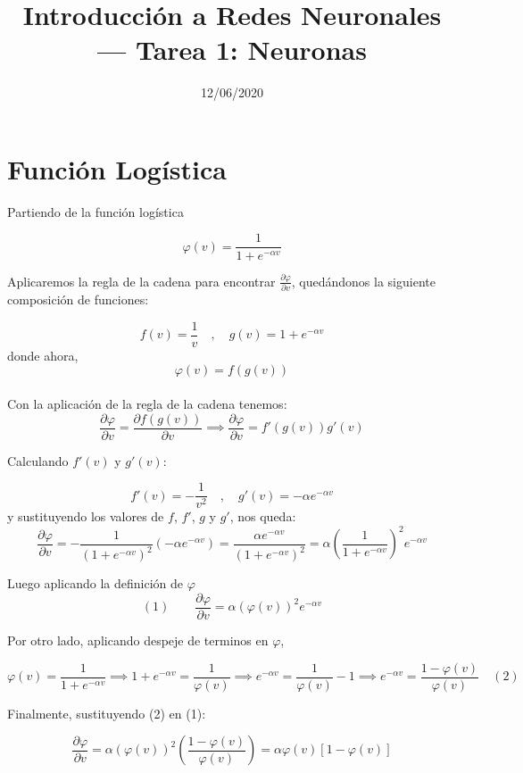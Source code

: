 \documentclass[a4paper]{article}
\title{Introducción a Redes Neuronales --- Tarea 1: Neuronas}
\author{David Segura, Carnet #13-11341
}
\date{12/06/2020}
\theoremstyle{definition}
\theoremstyle{plain}
\begin{document}
\maketitle


\section{Función Logística}

Partiendo de la función logística

$$ \varphi (v) = \frac{1}{1 + e^{-\alpha v}} $$

Aplicaremos la regla de la cadena para encontrar $ \frac{\partial \varphi}{\partial v} $, quedándonos la siguiente composición de funciones:

$$ f(v) = \frac{1}{v} \quad,\quad g(v) = 1 + e^{-\alpha v} $$
donde ahora,
$$ \varphi (v) = f(g(v)) $$\\

Con la aplicación de la regla de la cadena tenemos:
$$ \frac{\partial \varphi}{\partial v} =\frac{\partial f(g(v))}{\partial v} \implies \frac{\partial \varphi}{\partial v} = f'(g(v)) g'(v)$$

Calculando $f'(v) $ y $ g'(v)$: 

$$ f'(v) = - \frac{1}{v^2} \quad,\quad g'(v) = -\alpha e^{-\alpha v} $$
y sustituyendo los valores de $f$, $f'$, $g$ y $g'$, nos queda:
$$ \frac{\partial \varphi}{\partial v} = -\frac{1}{(1 + e^{-\alpha v})^2} (-\alpha e^{-\alpha v}) = \frac{\alpha e^{-\alpha v}}{(1 + e^{-\alpha v})^2} = \alpha \left(\frac{1}{1 + e^{-\alpha v}} \right)^2 e^{-\alpha v} $$ 

Luego aplicando la definición de $ \varphi $
$$ (1) \qquad \frac{\partial \varphi}{\partial v} = \alpha (\varphi (v))^2 e^{-\alpha v} $$

Por otro lado, aplicando despeje de terminos en $ \varphi $,

$$ \varphi (v) = \frac{1}{1 + e^{-\alpha v}} \implies 
1 + e^{-\alpha v} = \frac{1}{\varphi (v)} \implies
e^{-\alpha v} = \frac{1}{\varphi (v)} - 1 \implies
e^{-\alpha v} = \frac{1-\varphi (v)}{\varphi (v)} \quad (2)$$

Finalmente, sustituyendo (2) en (1):

$$ \frac{\partial \varphi}{\partial v} = \alpha (\varphi (v))^2 \left ( \frac{1-\varphi (v)}{\varphi (v)} \right) = \alpha \varphi (v) [1-\varphi (v)] $$
\end{document}
